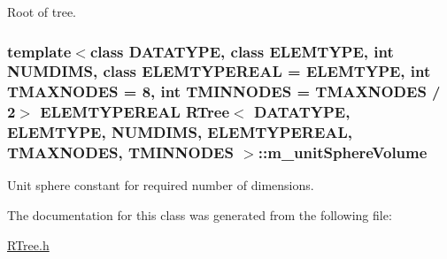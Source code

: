 Root of tree. 

\hypertarget{classRTree_af26d4beb8ce3a381ee75eabeec4727e3}{
\subsubsection[{m\-\_\-unit\-Sphere\-Volume}]{\setlength{\rightskip}{0pt plus 5cm}template$<$class D\-A\-T\-A\-T\-Y\-P\-E, class E\-L\-E\-M\-T\-Y\-P\-E, int N\-U\-M\-D\-I\-M\-S, class E\-L\-E\-M\-T\-Y\-P\-E\-R\-E\-A\-L = E\-L\-E\-M\-T\-Y\-P\-E, int T\-M\-A\-X\-N\-O\-D\-E\-S = 8, int T\-M\-I\-N\-N\-O\-D\-E\-S = T\-M\-A\-X\-N\-O\-D\-E\-S / 2$>$ E\-L\-E\-M\-T\-Y\-P\-E\-R\-E\-A\-L {\bf R\-Tree}$<$ D\-A\-T\-A\-T\-Y\-P\-E, E\-L\-E\-M\-T\-Y\-P\-E, N\-U\-M\-D\-I\-M\-S, E\-L\-E\-M\-T\-Y\-P\-E\-R\-E\-A\-L, T\-M\-A\-X\-N\-O\-D\-E\-S, T\-M\-I\-N\-N\-O\-D\-E\-S $>$\-::m\-\_\-unit\-Sphere\-Volume\hspace{0.3cm}{\ttfamily [protected]}}}\label{classRTree_af26d4beb8ce3a381ee75eabeec4727e3}


Unit sphere constant for required number of dimensions. 



The documentation for this class was generated from the following file\-:\begin{DoxyCompactItemize}
\item 
\hyperlink{RTree_8h}{R\-Tree.\-h}\end{DoxyCompactItemize}
